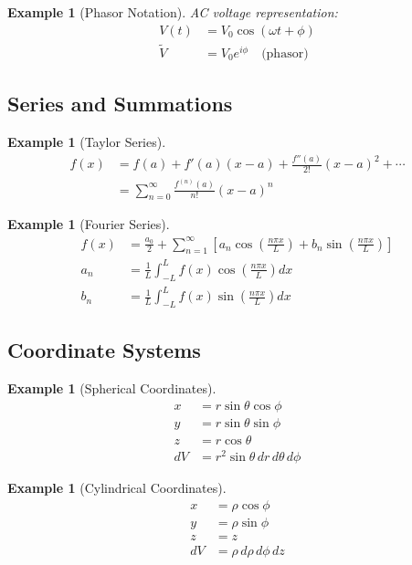 \documentclass{article}
\newtheorem{example}[theorem]{Example}
\begin{document}
\begin{example}[Phasor Notation]
AC voltage representation:
\begin{align*}
    V(t) &= V_0\cos(\omega t + \phi) \\
    \tilde{V} &= V_0e^{i\phi} \quad \text{(phasor)}
\end{align*}
\end{example}

\subsection{Series and Summations}

\begin{example}[Taylor Series]
\begin{align*}
    f(x) &= f(a) + f'(a)(x-a) + \frac{f''(a)}{2!}(x-a)^2 + \cdots \\
    &= \sum_{n=0}^{\infty} \frac{f^{(n)}(a)}{n!}(x-a)^n
\end{align*}
\end{example}

\begin{example}[Fourier Series]
\begin{align*}
    f(x) &= \frac{a_0}{2} + \sum_{n=1}^{\infty} \left[a_n\cos\left(\frac{n\pi x}{L}\right) + b_n\sin\left(\frac{n\pi x}{L}\right)\right] \\
    a_n &= \frac{1}{L}\int_{-L}^L f(x)\cos\left(\frac{n\pi x}{L}\right)dx \\
    b_n &= \frac{1}{L}\int_{-L}^L f(x)\sin\left(\frac{n\pi x}{L}\right)dx
\end{align*}
\end{example}

\subsection{Coordinate Systems}

\begin{example}[Spherical Coordinates]
\begin{align*}
    x &= r\sin\theta\cos\phi \\
    y &= r\sin\theta\sin\phi \\
    z &= r\cos\theta \\
    dV &= r^2\sin\theta \, dr \, d\theta \, d\phi
\end{align*}
\end{example}

\begin{example}[Cylindrical Coordinates]
\begin{align*}
    x &= \rho\cos\phi \\
    y &= \rho\sin\phi \\
    z &= z \\
    dV &= \rho \, d\rho \, d\phi \, dz
\end{align*}
\end{example}
\end{document}
